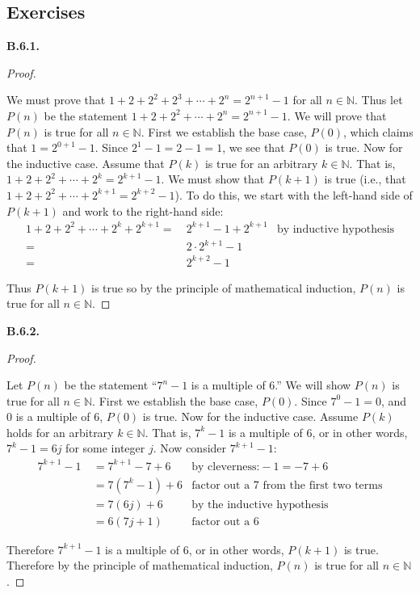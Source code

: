 \documentclass[10pt,]{book}
\theoremstyle{plain}
\theoremstyle{definition}
\theoremstyle{definition}
\theoremstyle{definition}
\theoremstyle{definition}
\numberwithin{equation}{chapter}
\def\N{\mathbb N}
\newcommand{\amp}{&}
\begin{document}
\subsection*{ Exercises}
\noindent\textbf{B.6.1.} \begin{proof}\hypertarget{proof-41}{}
\hypertarget{p-2149}{}%
We must prove that \(1 + 2 + 2^2 + 2^3 + \cdots +2^n = 2^{n+1} - 1\) for all \(n \in \N\). Thus let \(P(n)\) be the statement \(1 + 2 + 2^2 + \cdots + 2^n = 2^{n+1} - 1\). We will prove that \(P(n)\) is true for all \(n \in \N\). First we establish the base case, \(P(0)\), which claims that \(1 = 2^{0+1} -1\). Since \(2^1 - 1 = 2 - 1 = 1\), we see that \(P(0)\) is true. Now for the inductive case. Assume that \(P(k)\) is true for an arbitrary \(k \in \N\). That is, \(1 + 2 + 2^2 + \cdots + 2^k = 2^{k+1} - 1\). We must show that \(P(k+1)\) is true (i.e., that \(1 + 2 + 2^2 + \cdots + 2^{k+1} = 2^{k+2} - 1\)). To do this, we start with the left-hand side of \(P(k+1)\) and work to the right-hand side:%
\begin{align*}
1 + 2 + 2^2 + \cdots + 2^k + 2^{k+1} = \amp ~ 2^{k+1} - 1 + 2^{k+1} \amp \text{by inductive hypothesis}\\
= \amp ~2\cdot 2^{k+1} - 1 \amp\\
= \amp ~ 2^{k+2} - 1 \amp
\end{align*}
%
\par
\hypertarget{p-2150}{}%
Thus \(P(k+1)\) is true so by the principle of mathematical induction, \(P(n)\) is true for all \(n \in \N\).%
\end{proof}
\par\smallskip
\noindent\textbf{B.6.2.} \begin{proof}\hypertarget{proof-42}{}
\hypertarget{p-2152}{}%
Let \(P(n)\) be the statement ``\(7^n - 1\) is a multiple of 6.'' We will show \(P(n)\) is true for all \(n \in \N\). First we establish the base case, \(P(0)\). Since \(7^0 - 1 = 0\), and \(0\) is a multiple of 6, \(P(0)\) is true. Now for the inductive case. Assume \(P(k)\) holds for an arbitrary \(k \in \N\). That is, \(7^k - 1\) is a multiple of 6, or in other words, \(7^k - 1 = 6j\) for some integer \(j\). Now consider \(7^{k+1} - 1\):%
\begin{align*}
7^{k+1} - 1 ~ \amp = 7^{k+1} - 7 + 6 \amp \text{by cleverness:} -1 = -7 + 6\\
\amp = 7(7^k - 1) + 6 \amp \text{factor out a 7 from the first two terms}\\
\amp = 7(6j) + 6 \amp \text{by the inductive hypothesis}\\
\amp = 6(7j + 1) \amp \text{factor out a 6}
\end{align*}
%
\par
\hypertarget{p-2153}{}%
Therefore \(7^{k+1} - 1\) is a multiple of 6, or in other words, \(P(k+1)\) is true. Therefore by the principle of mathematical induction, \(P(n)\) is true for all \(n \in \N\).%
\end{proof}
\end{document}
